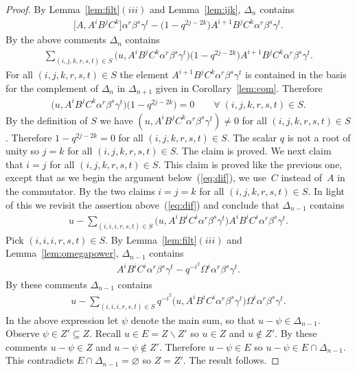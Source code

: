 \begin{proof}
By
Lemma~\ref{lem:filt}$(iii)$ and
Lemma~\ref{lem:ijk}, $\Delta_n$ contains
\begin{gather*}
\big\lbrack A, A^iB^jC^k \big\rbrack
\alpha^r \beta^s \gamma^t
-
\big(1-q^{2j-2k}\big)  A^{i+1}B^jC^k
\alpha^r \beta^s \gamma^t.
\end{gather*}
By the above comments
$\Delta_n$ contains
\begin{gather*}
\sum_{
(i,j,k,r,s,t) \in S}
\big(u, A^iB^jC^k
\alpha^r \beta^s \gamma^t \big)
\big(1-q^{2j-2k}\big)  A^{i+1}B^jC^k
\alpha^r \beta^s \gamma^t.
\end{gather*}
For all
$(i,j,k,r,s,t) \in S$
the element
$A^{i+1}B^jC^k
\alpha^r \beta^s \gamma^t$
is contained
in the basis for the complement of $\Delta_n$ in $\Delta_{n+1}$
given in Corollary~\ref{lem:com}. Therefore
\begin{gather*}
\big(u, A^iB^jC^k
\alpha^r \beta^s \gamma^t\big)
\big(1-q^{2j-2k}\big)  = 0
\qquad
\forall \;(i,j,k,r,s,t) \in S.
\end{gather*}
By the def\/inition of $S$ we have
$( u, A^iB^jC^k
\alpha^r \beta^s \gamma^t )\not=0$
 for
all
$(i,j,k,r,s,t) \in S$.
Therefore
$1-q^{2j-2k} = 0 $ for all
$(i,j,k,r,s,t) \in S$.
The scalar $q$ is not a root of unity
so $j=k$ for all
$(i,j,k,r,s,t) \in S$.
The claim is proved.
We next claim that
$i=j$ for all
$(i,j,k,r,s,t) \in S$.
This claim is proved like the previous one,
 except that
as we begin the argument below~(\ref{eq:dif}),
we use~$C$ instead of~$A$ in the commutator.
By the two claims
$i=j=k$ for all
$(i,j,k,r,s,t) \in S$.
In light of this we revisit the assertion above~(\ref{eq:dif}) and conclude that
$\Delta_{n-1}$ contains
\begin{gather*}
u-\sum_{
(i,i,i,r,s,t) \in S}
\big(u, A^iB^iC^i
\alpha^r \beta^s \gamma^t \big)
A^{i}B^iC^i
\alpha^r \beta^s \gamma^t.
\end{gather*}
Pick
$(i,i,i,r,s,t) \in S$.
By
Lemma~\ref{lem:filt}$(iii)$ and
Lemma~\ref{lem:omegapower},
$\Delta_{n-1}$ contains
\begin{gather*}
A^iB^iC^i
\alpha^r \beta^s \gamma^t
-q^{-i^2}\Omega^i \alpha^r \beta^s \gamma^t.
\end{gather*}
By these comments
$\Delta_{n-1}$ contains
\begin{gather*}
\label{eq:summ}
u-
\sum_{
(i,i,i,r,s,t) \in S}
q^{-i^2}
\big(u, A^iB^iC^i
\alpha^r \beta^s \gamma^t  \big)
\Omega^i \alpha^r \beta^s \gamma^t.
\end{gather*}
In the above expression let
$\psi$ denote the main sum,
so that
$u-\psi \in \Delta_{n-1}$.
Observe
$\psi \in Z' \subseteq Z$.
Recall $u \in E=Z\backslash Z'$ so
$u \in Z$ and $u \not\in Z'$. By these comments
$u - \psi \in Z$ and
$u - \psi \not\in Z'$.
Therefore $u - \psi \in E$ so
 $u - \psi \in E\cap \Delta_{n-1}$.
This contradicts
 $E\cap \Delta_{n-1}=\varnothing $ so
$Z=Z'$. The result follows.
\end{proof}
